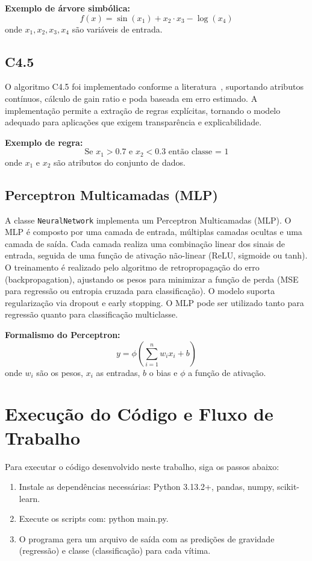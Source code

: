 \documentclass[11pt]{article}
\begin{document}
\textbf{Exemplo de árvore simbólica:}
\[
f(x) = \sin(x_1) + x_2 \cdot x_3 - \log(x_4)
\]
onde $x_1, x_2, x_3, x_4$ são variáveis de entrada.

\subsection{C4.5}
O algoritmo C4.5 foi implementado conforme a literatura~\cite{quinlan1993c4.5}, suportando atributos contínuos, cálculo de gain ratio e poda baseada em erro estimado. A implementação permite a extração de regras explícitas, tornando o modelo adequado para aplicações que exigem transparência e explicabilidade.

\textbf{Exemplo de regra:}
\[
\text{Se } x_1 > 0.7 \text{ e } x_2 < 0.3 \text{ então classe = 1}
\]
onde $x_1$ e $x_2$ são atributos do conjunto de dados.

\subsection{Perceptron Multicamadas (MLP)}
A classe \texttt{NeuralNetwork} implementa um Perceptron Multicamadas (MLP). O MLP é composto por uma camada de entrada, múltiplas camadas ocultas e uma camada de saída. Cada camada realiza uma combinação linear dos sinais de entrada, seguida de uma função de ativação não-linear (ReLU, sigmoide ou tanh). O treinamento é realizado pelo algoritmo de retropropagação do erro (backpropagation), ajustando os pesos para minimizar a função de perda (MSE para regressão ou entropia cruzada para classificação). O modelo suporta regularização via dropout e early stopping. O MLP pode ser utilizado tanto para regressão quanto para classificação multiclasse.

\textbf{Formalismo do Perceptron:}
\[
y = \phi\left(\sum_{i=1}^n w_i x_i + b\right)
\]
onde $w_i$ são os pesos, $x_i$ as entradas, $b$ o bias e $\phi$ a função de ativação.

\section{Execução do Código e Fluxo de Trabalho}
Para executar o código desenvolvido neste trabalho, siga os passos abaixo:
\begin{enumerate}
    \item Instale as dependências necessárias: Python 3.13.2+, pandas, numpy, scikit-learn.
    \item Execute os scripts com: python main.py.
    \item O programa gera um arquivo de saída com as predições de gravidade (regressão) e classe (classificação) para cada vítima.
\end{enumerate}
\end{document}
